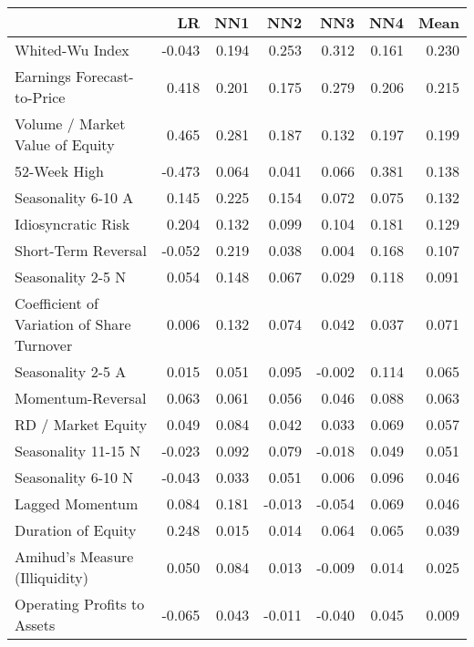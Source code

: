 \begin{tabular}{lrrrrrr}
\toprule
{} &     LR &    NN1 &    NN2 &    NN3 &    NN4 &   Mean \\
\midrule
Whited-Wu Index                            & -0.043 &  0.194 &  0.253 &  0.312 &  0.161 &  0.230 \\
Earnings Forecast-to-Price                 &  0.418 &  0.201 &  0.175 &  0.279 &  0.206 &  0.215 \\
Volume / Market Value of Equity            &  0.465 &  0.281 &  0.187 &  0.132 &  0.197 &  0.199 \\
52-Week High                               & -0.473 &  0.064 &  0.041 &  0.066 &  0.381 &  0.138 \\
Seasonality 6-10 A                         &  0.145 &  0.225 &  0.154 &  0.072 &  0.075 &  0.132 \\
Idiosyncratic Risk                         &  0.204 &  0.132 &  0.099 &  0.104 &  0.181 &  0.129 \\
Short-Term Reversal                        & -0.052 &  0.219 &  0.038 &  0.004 &  0.168 &  0.107 \\
Seasonality 2-5 N                          &  0.054 &  0.148 &  0.067 &  0.029 &  0.118 &  0.091 \\
Coefficient of Variation of Share Turnover &  0.006 &  0.132 &  0.074 &  0.042 &  0.037 &  0.071 \\
Seasonality 2-5 A                          &  0.015 &  0.051 &  0.095 & -0.002 &  0.114 &  0.065 \\
Momentum-Reversal                          &  0.063 &  0.061 &  0.056 &  0.046 &  0.088 &  0.063 \\
RD / Market Equity                         &  0.049 &  0.084 &  0.042 &  0.033 &  0.069 &  0.057 \\
Seasonality 11-15 N                        & -0.023 &  0.092 &  0.079 & -0.018 &  0.049 &  0.051 \\
Seasonality 6-10 N                         & -0.043 &  0.033 &  0.051 &  0.006 &  0.096 &  0.046 \\
Lagged Momentum                            &  0.084 &  0.181 & -0.013 & -0.054 &  0.069 &  0.046 \\
Duration of Equity                         &  0.248 &  0.015 &  0.014 &  0.064 &  0.065 &  0.039 \\
Amihud's Measure (Illiquidity)             &  0.050 &  0.084 &  0.013 & -0.009 &  0.014 &  0.025 \\
Operating Profits to Assets                & -0.065 &  0.043 & -0.011 & -0.040 &  0.045 &  0.009 \\

\end{tabular}
